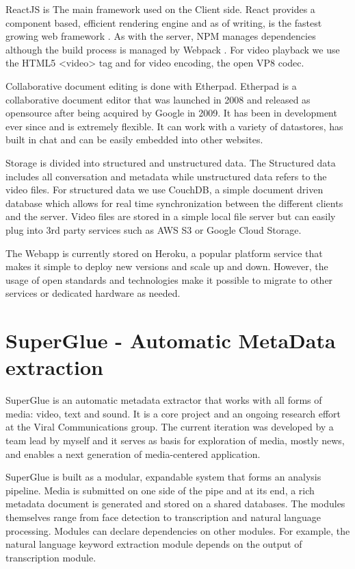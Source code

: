 ReactJS is The main framework used on the Client side. React provides a component based, efficient rendering engine and as of writing, is the fastest growing web framework \cite{reactjs}. As with the server, NPM manages dependencies although the build process is managed by Webpack \cite{webpack}. For video playback we use the HTML5 <video> tag and for video encoding, the open VP8\cite{vp8} codec. 

Collaborative document editing is done with Etherpad\cite{etherpad}. Etherpad is a collaborative document editor that was launched in 2008 and released as opensource after being acquired by Google in 2009. It has been in development ever since and is extremely flexible. It can work with a variety of datastores, has built in chat and can be easily embedded into other websites.

Storage is divided into structured and unstructured data. The Structured data includes all conversation and metadata while unstructured data refers to the video files. For structured data we use CouchDB\cite{couchdb}, a simple document driven database which allows for real time synchronization between the different clients and the server.  Video files are stored in a simple local file server but can easily plug into 3rd party services such as AWS S3 or Google Cloud Storage.

The Webapp is currently stored on Heroku\cite{heroku}, a popular platform service that makes it simple to deploy new versions and scale up and down. However, the usage of open standards and technologies make it possible to migrate to other services or dedicated hardware as needed. 

\section{SuperGlue - Automatic MetaData extraction}
SuperGlue is an automatic metadata extractor that works with all forms of media: video, text and sound. It is a core project and an ongoing research effort at the Viral Communications group. The current iteration was developed by a team lead by myself and it serves as basis for exploration of media, mostly news, and enables a next generation of media-centered application.

SuperGlue is built as a modular, expandable system that forms an analysis pipeline. Media is submitted on one side of the pipe and at its end, a rich metadata document is generated and stored on a shared databases. The modules themselves range from face detection to transcription and natural language processing. Modules can declare dependencies on other modules. For example, the natural language keyword extraction module depends on the output of transcription module.

